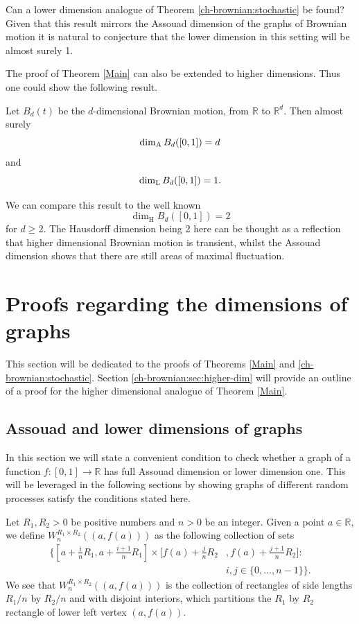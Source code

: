 \begin{question}
Can a lower dimension analogue of Theorem \ref{ch-brownian:stochastic} be found? Given that this result mirrors the Assouad dimension of the graphs of Brownian motion it is natural to conjecture that the lower dimension in this setting will be almost surely 1.
\end{question}


The proof of Theorem \ref{Main} can also be extended to higher dimensions. Thus one could show the following result.

Let $B_d(t)$ be the $d$-dimensional Brownian motion, from $\mathbb{R}$ to $\mathbb{R}^d$. Then almost surely
\[
\dim_{\textup{A}} B_d([0,1])=d
\]
and 
\[
\dim_{\textup{L}} B_d([0,1]) = 1.
\]
	
We can compare this result to the well known \[\dim_{\mathrm{H}} B_d([0,1])=2\] for $d\geq 2$. The Hausdorff dimension being 2 here can be thought as a reflection that higher dimensional Brownian motion is transient, whilst the Assouad dimension shows that there are still areas of maximal fluctuation. 



\section{Proofs regarding the dimensions of graphs}

This section will be dedicated to the proofs of Theorems \ref{Main} and \ref{ch-brownian:stochastic}. Section \ref{ch-brownian:sec:higher-dim} will provide an outline of a proof for the higher dimensional analogue of Theorem \ref{Main}.


\subsection{Assouad and lower dimensions of graphs}\label{ch:brownian:graph-proof}
In this section we will state a convenient condition to check whether a graph of a function $f:[0,1]\to\mathbb{R}$ has full Assouad dimension or lower dimension one. This will be leveraged in the following sections by showing graphs of different random processes satisfy the conditions stated here.


Let $R_1,R_2>0$ be positive numbers and $n>0$ be an integer. Given a point $a\in\mathbb{R}$, we define $W_{n}^{R_1\times R_2}((a, f(a)))$ as the following collection of sets
\begin{align*}
	\Bigg\{\left[a+\frac{i}{n}R_{1}, a+\frac{i+1}{n}R_{1}\right]\times \bigg[f(a)+\frac{j}{n}R_{2}&,f(a)+\frac{j+1}{n}R_{2}\bigg] \colon \\
	    & i,j\in\{0,\dots,n-1\}\Bigg\}.
\end{align*}
We see that $W_{n}^{R_1\times R_2}((a,f(a)))$ is the collection of rectangles of side lengths $R_1/n$ by $R_2/n$ and with disjoint interiors, which partitions the $R_1$ by $R_2$ rectangle of lower left vertex $(a,f(a))$.
	
